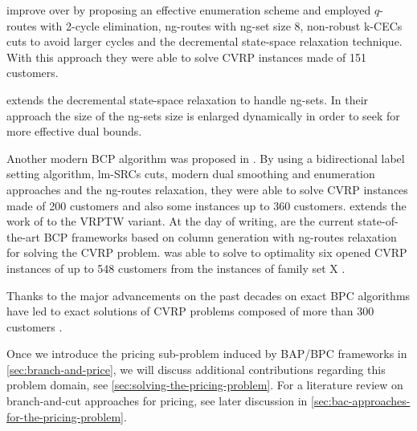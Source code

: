 \textcite{contardo2014} improve over \textcite{contardo2011}
by proposing an effective enumeration scheme and employed
$q$-routes with 2-cycle elimination, ng-routes with ng-set size 8,
non-robust k-CECs cuts to avoid larger cycles
and the decremental state-space relaxation technique.
With this approach they were able to solve CVRP instances made of 151 customers.

\textcite{martinelli2014} extends the decremental state-space relaxation
to handle ng-sets.
In their approach the size of the ng-sets size
is enlarged dynamically in order to seek for more effective dual bounds.

Another modern BCP algorithm was proposed in \textcite{pecin2017improved}.
By using a bidirectional label setting algorithm,
lm-SRCs cuts, modern dual smoothing and enumeration approaches
and the ng-routes relaxation, they were able to solve CVRP instances made of 200 customers
and also some instances up to 360 customers.
\textcite{pecin2017new} extends the work of \textcite{pecin2017improved} to the VRPTW variant.
At the day of writing, \textcite{pessoa2018enhanced, pessoa2020generic} are the current state-of-the-art
BCP frameworks based on column generation with ng-routes relaxation
for solving the CVRP problem.
\textcite{pessoa2020generic} was able to solve to optimality six opened
CVRP instances of up to 548 customers from the instances of family set X \parencite{uchoa2017}.

Thanks to the major advancements on the past decades
on exact BPC algorithms
have led to exact solutions of CVRP problems composed of
more than 300 customers \parencite{costa2019}.

Once we introduce the pricing sub-problem induced by BAP/BPC frameworks
in \cref{sec:branch-and-price},
we will discuss additional contributions regarding this problem domain,
see \cref{sec:solving-the-pricing-problem}.
For a literature review on branch-and-cut approaches for pricing, see later discussion
in \cref{sec:bac-approaches-for-the-pricing-problem}.

\begin{comment}
\cite{jepsen2011}

Before 1980 very few exact algorithms for cvrp and vrptw had been
proposed, but in the early 1980s two new exact methods where proposed.
From this point the history of exact methods for cvrp and vrptw can
be divided into three phases. The first phase was the introduction of the
Set Partition and the development of Branch-and-Cut-and-Price (bp) algo-
rithms using a relaxed pricing problem. The second was the development of
Branch-and-Cut (bac) algorithms. In the current phase the pricing problem
is no longer relaxed and cuts in the master problem of the Branch-and-Cut-
and-Price algorithms is used. The first two phases where started at the same
point in time and there is still development on the algorithms in the context
of cvrp and vrptw. The algorithms from these two phases are also used
on several other variants of the Vehicle Routing Problem. The third phase
was started in the middle of the 2000s and the algorithms from this phase
are currently the best overall performing algorithms.
\end{comment}

